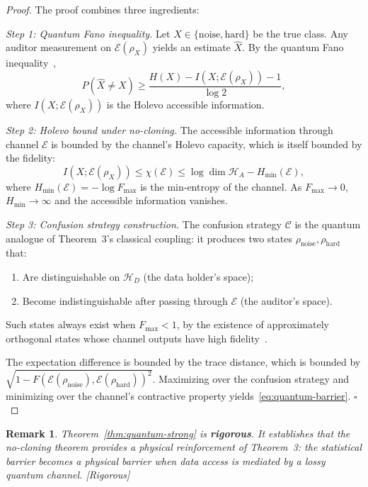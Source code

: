 \documentclass[12pt,a4paper]{article}
\newtheorem{remark}[theorem]{Remark}
\newcommand{\rigorous}{\textcolor{green!50!black}{\small\textsf{[Rigorous]}}}
\newcommand{\cH}{\mathcal{H}}
\newcommand{\cE}{\mathcal{E}}
\newcommand{\cC}{\mathcal{C}}
\begin{document}
\begin{proof}
The proof combines three ingredients:

\textit{Step 1: Quantum Fano inequality.}
Let $X\in\{\mathrm{noise},\mathrm{hard}\}$ be the true class.  Any auditor
measurement on $\cE(\rho_X)$ yields an estimate $\hat{X}$.  By the quantum
Fano inequality~\citep{hayashi2017quantum},
\begin{equation}\label{eq:q-fano}
    P(\hat{X}\neq X) \geq
    \frac{H(X) - I(X;\cE(\rho_X)) - 1}{\log 2},
\end{equation}
where $I(X;\cE(\rho_X))$ is the Holevo accessible information.

\textit{Step 2: Holevo bound under no-cloning.}
The accessible information through channel $\cE$ is bounded by the channel's
Holevo capacity, which is itself bounded by the fidelity:
\begin{equation}\label{eq:holevo-fidelity}
    I(X;\cE(\rho_X)) \leq \chi(\cE) \leq
    \log\dim\cH_A - H_{\min}(\cE),
\end{equation}
where $H_{\min}(\cE) = -\log F_{\max}$ is the min-entropy of the channel.
As $F_{\max}\to0$, $H_{\min}\to\infty$ and the accessible information vanishes.

\textit{Step 3: Confusion strategy construction.}
The confusion strategy $\cC$ is the quantum analogue of Theorem~3's classical
coupling: it produces two states $\rho_{\mathrm{noise}},\rho_{\mathrm{hard}}$
that:
\begin{enumerate}[label=(\roman*)]
    \item Are distinguishable on $\cH_D$ (the data holder's space);
    \item Become indistinguishable after passing through $\cE$ (the auditor's
          space).
\end{enumerate}
Such states always exist when $F_{\max}<1$, by the existence of approximately
orthogonal states whose channel outputs have high fidelity~\citep{schumacher1996quantum}.

The expectation difference is bounded by the trace distance, which is bounded
by $\sqrt{1-F(\cE(\rho_{\mathrm{noise}}),\cE(\rho_{\mathrm{hard}}))^2}$.
Maximizing over the confusion strategy and minimizing over the channel's
contractive property yields~\eqref{eq:quantum-barrier}. $\square$
\end{proof}

\begin{remark}
Theorem~\ref{thm:quantum-strong} is \textbf{rigorous}.  It establishes that the
no-cloning theorem provides a \emph{physical reinforcement} of Theorem~3: the
statistical barrier becomes a physical barrier when data access is mediated by
a lossy quantum channel.  \rigorous
\end{remark}
\end{document}
